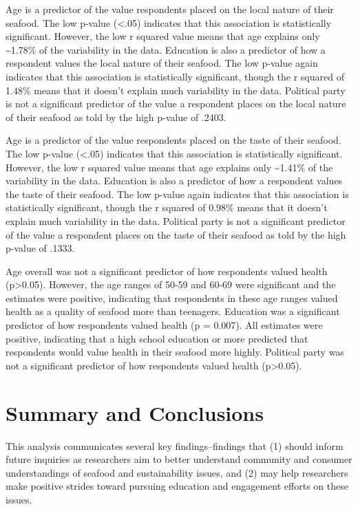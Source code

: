 \documentclass[
  12pt,
]{article}
\begin{document}
Age is a predictor of the value respondents placed on the local nature
of their seafood. The low p-value (\textless.05) indicates that this
association is statistically significant. However, the low r squared
value means that age explains only \textasciitilde1.78\% of the
variability in the data. Education is also a predictor of how a
respondent values the local nature of their seafood. The low p-value
again indicates that this association is statistically significant,
though the r squared of 1.48\% means that it doesn't explain much
variability in the data. Political party is not a significant predictor
of the value a respondent places on the local nature of their seafood as
told by the high p-value of .2403.

Age is a predictor of the value respondents placed on the taste of their
seafood. The low p-value (\textless.05) indicates that this association
is statistically significant. However, the low r squared value means
that age explains only \textasciitilde1.41\% of the variability in the
data. Education is also a predictor of how a respondent values the taste
of their seafood. The low p-value again indicates that this association
is statistically significant, though the r squared of 0.98\% means that
it doesn't explain much variability in the data. Political party is not
a significant predictor of the value a respondent places on the taste of
their seafood as told by the high p-value of .1333.

Age overall was not a significant predictor of how respondents valued
health (p\textgreater0.05). However, the age ranges of 50-59 and 60-69
were significant and the estimates were positive, indicating that
respondents in these age ranges valued health as a quality of seafood
more than teenagers. Education was a significant predictor of how
respondents valued health (p = 0.007). All estimates were positive,
indicating that a high school education or more predicted that
respondents would value health in their seafood more highly. Political
party was not a significant predictor of how respondents valued health
(p\textgreater0.05).

\newpage

\hypertarget{summary-and-conclusions}{%
\section{Summary and Conclusions}\label{summary-and-conclusions}}

This analysis communicates several key findings--findings that (1)
should inform future inquiries as researchers aim to better understand
community and consumer understandings of seafood and sustainability
issues, and (2) may help researchers make positive strides toward
pursuing education and engagement efforts on these issues.
\end{document}
